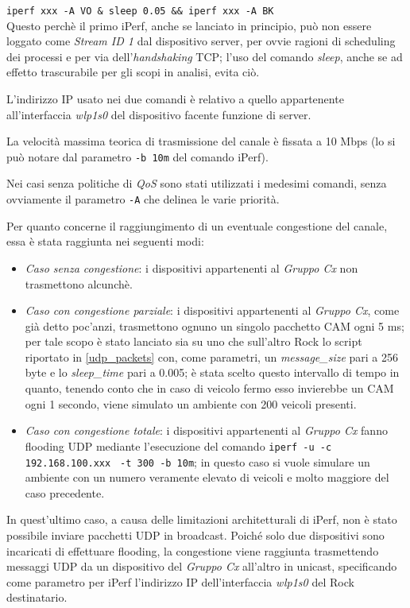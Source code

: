 \verb|iperf xxx -A VO & sleep 0.05 && iperf xxx -A BK| \\
\noindent Questo perchè il primo iPerf, anche se lanciato in principio, può non essere loggato come \textit{Stream ID 1} dal dispositivo server, per ovvie ragioni di scheduling dei processi e per via dell'\textit{handshaking} TCP; l'uso del comando \textit{sleep}, anche se ad effetto trascurabile per gli scopi in analisi, evita ciò.

L'indirizzo IP usato nei due comandi è relativo a quello appartenente all'interfaccia \textit{wlp1s0} del dispositivo facente funzione di server.

La velocità massima teorica di trasmissione del canale è fissata a 10 Mbps (lo si può notare dal parametro \verb|-b 10m| del comando iPerf).

Nei casi senza politiche di \textit{QoS} sono stati utilizzati i medesimi comandi, senza ovviamente il parametro \verb|-A| che delinea le varie priorità.

Per quanto concerne il raggiungimento di un eventuale congestione del canale, essa è stata raggiunta nei seguenti modi:

\begin{itemize}
    \item \textit{Caso senza congestione}: i dispositivi appartenenti al \textit{Gruppo Cx} non trasmettono alcunchè.
    \item \textit{Caso con congestione parziale}: i dispositivi appartenenti al \textit{Gruppo Cx}, come già detto poc'anzi, trasmettono ognuno un singolo pacchetto CAM ogni 5 ms; per tale scopo è stato lanciato sia su uno che sull'altro Rock lo script riportato in \autoref{udp_packets} con, come parametri, un \textit{message\_size} pari a 256 byte e lo \textit{sleep\_time} pari a 0.005; è stata scelto questo intervallo di tempo in quanto, tenendo conto che in caso di veicolo fermo esso invierebbe un CAM ogni 1 secondo, viene simulato un ambiente con 200 veicoli presenti.
    \item \textit{Caso con congestione totale}: i dispositivi appartenenti al \textit{Gruppo Cx} fanno flooding UDP mediante l'esecuzione del comando \verb|iperf -u -c 192.168.100.xxx| \verb| -t 300 -b 10m|; in questo caso si vuole simulare un ambiente con un numero veramente elevato di veicoli e molto maggiore del caso precedente.
\end{itemize}

In quest'ultimo caso, a causa delle limitazioni architetturali di iPerf, non è stato possibile inviare pacchetti UDP in broadcast. Poiché solo due dispositivi sono incaricati di effettuare flooding, la congestione viene raggiunta trasmettendo messaggi UDP da un dispositivo del \textit{Gruppo Cx} all'altro in unicast, specificando come parametro per iPerf l'indirizzo IP dell'interfaccia \textit{wlp1s0} del Rock destinatario.

